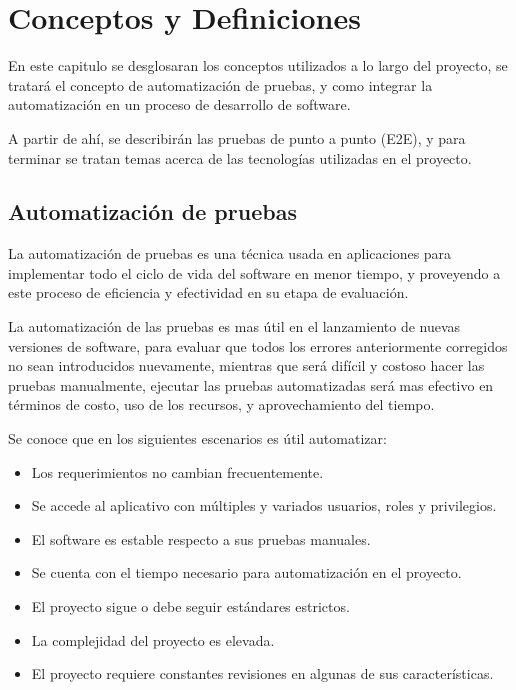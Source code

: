 \chapter{Conceptos y Definiciones}

En este capitulo se desglosaran los conceptos utilizados a lo largo del
proyecto, se tratará el concepto de automatización de pruebas, y como integrar
la automatización en un proceso de desarrollo de software.

A partir de ahí, se describirán las pruebas de punto a punto (E2E), y para
terminar se tratan temas acerca de las tecnologías utilizadas en el proyecto.

\section{Automatización de pruebas}
La automatización de pruebas es una técnica usada en aplicaciones para
implementar todo el ciclo de vida del software en menor tiempo, y proveyendo a
este proceso de eficiencia y efectividad en su etapa de evaluación.

La automatización de las pruebas es mas útil en el lanzamiento de nuevas
versiones de software, para evaluar que todos los errores anteriormente
corregidos no sean introducidos nuevamente, mientras que será difícil y costoso
hacer las pruebas manualmente, ejecutar las pruebas automatizadas será mas
efectivo en términos de costo, uso de los recursos, y aprovechamiento del
tiempo.

Se conoce que en los siguientes escenarios es útil automatizar:

\begin{itemize}
    \item Los requerimientos no cambian frecuentemente.
    \item Se accede al aplicativo con múltiples y variados usuarios, roles y
        privilegios.
    \item El software es estable respecto a sus pruebas manuales.
    \item Se cuenta con el tiempo necesario para automatización en el proyecto.
    \item El proyecto sigue o debe seguir estándares estrictos.
    \item La complejidad del proyecto es elevada.
    \item El proyecto requiere constantes revisiones en algunas de sus
    características.
\end{itemize}

